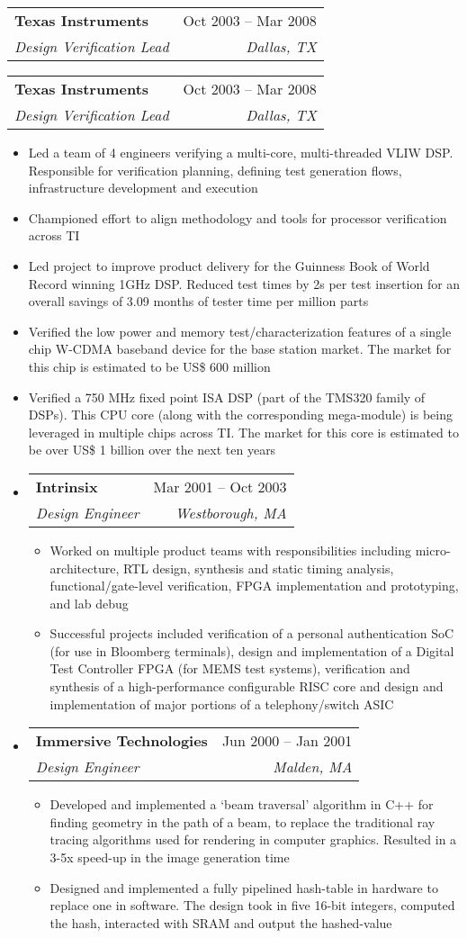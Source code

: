 \documentclass[letterpaper,12pt]{article}[leftmargin=*]
\makeatletter
\def \entryspacing {-0pt}
\newcommand{\resumeEntryStart}{\begin{itemize}[leftmargin=2.5mm]}
\newcommand{\resumeEntryEnd}{\end{itemize}\vspace{\entryspacing}}
\newcommand{\resumeItemListStart}{\begin{itemize}[leftmargin=4.5mm]}
\newcommand{\resumeItemListEnd}{\end{itemize}}
\newcommand{\resumeItem}[1]{
\item\small{
  {#1 \vspace{-2pt}}
}
}
\newcommand{\resumeEntryTSDL}[4]{
  \vspace{-1pt}\item[]
  \begin{tabularx}{0.97\textwidth}{X@{\hspace{60pt}}r}
    \textbf{\color{primary}#1} & {\firabook\color{accent}\small#2} \\
    \textit{\color{accent}\small#3} & \textit{\color{accent}\small#4} \\
  \end{tabularx}\vspace{-6pt}
}
\newcommand{\resumeEntryTSDLpart}[2]{
  \vspace{-6pt}\item[]
  \begin{tabularx}{0.97\textwidth}{X@{\hspace{60pt}}r}
    \textit{\color{accent}\small#1} & \textit{\color{accent}\small#2} \\
  \end{tabularx}\vspace{-6pt}
}
\makeatother
\begin{document}
\resumeEntryStart
{} {
\resumeEntryTSDL
   {Texas Instruments}{Oct 2003 -- Mar 2008}
   {Design Verification Lead}{Dallas, TX}  
}{
\resumeEntryTSDL
   {Texas Instruments}{Oct 2003 -- Mar 2008}
   {Design Verification Lead}{Dallas, TX}
}    
   \resumeItemListStart
   \resumeItem {Led a team of 4 engineers verifying a multi-core, multi-threaded VLIW DSP. Responsible for verification planning, defining test generation flows, infrastructure development and execution}
   \resumeItem {Championed effort to align methodology and tools for processor verification across TI}
   \resumeItem {Led project to improve product delivery for the Guinness Book of World Record winning 1GHz DSP. Reduced test times by 2s per test insertion for an overall savings of 3.09 months of tester time per million parts}
   \resumeItem {Verified the low power and memory test/characterization features of a single chip W-CDMA baseband device for the base station market. The market for this chip is estimated to be US\$ 600 million}   
   \resumeItem {Verified a 750 MHz fixed point ISA DSP (part of the TMS320 family of DSPs). This CPU core (along with the corresponding mega-module) is being leveraged in multiple chips across TI. The market for this core is estimated to be over US\$ 1 billion over the next ten years}
   \resumeItemListEnd
\resumeEntryEnd   

\resumeEntryStart
\resumeEntryTSDL
   {Intrinsix}{Mar 2001 -- Oct 2003}
   {Design Engineer}{Westborough, MA}
   \resumeItemListStart
   \resumeItem {Worked on multiple product teams with responsibilities including micro-architecture, RTL design, synthesis and static timing analysis, functional/gate-level verification, FPGA implementation and prototyping, and lab debug}
   \resumeItem {Successful projects included verification of a personal authentication SoC (for use in Bloomberg terminals), design and implementation of a Digital Test Controller FPGA (for MEMS test systems), verification and synthesis of a high-performance configurable RISC core and design and implementation of major portions of a telephony/switch ASIC}
   \resumeItemListEnd
\resumeEntryEnd

\resumeEntryStart
\resumeEntryTSDL
   {Immersive Technologies}{Jun 2000 -- Jan 2001}
   {Design Engineer}{Malden, MA}
   \resumeItemListStart
   \resumeItem {Developed and implemented a ‘beam traversal’ algorithm in C++ for finding geometry in the path of a beam, to replace the traditional ray tracing algorithms used for rendering in computer graphics. Resulted in a 3-5x speed-up in the image generation time}
   \resumeItem {Designed and implemented a fully pipelined hash-table in hardware to replace one in software. The design took in five 16-bit integers, computed the hash, interacted with SRAM and output the hashed-value}
   \resumeItemListEnd
\resumeEntryEnd
\end{document}
